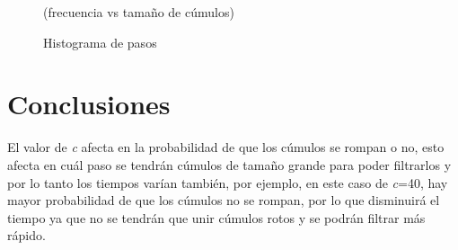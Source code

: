 \documentclass{article}
\begin{document}
\begin{figure}[h!]
\centering
{}
\caption{Histograma de pasos} (frecuencia vs tamaño de cúmulos) \label{fig7}
\end{figure}

\newpage
\section{Conclusiones}
El valor de \textit{c} afecta en la probabilidad de que los cúmulos se rompan o no, esto afecta en cuál paso se tendrán cúmulos de tamaño grande para poder filtrarlos y por lo tanto los tiempos varían también, por ejemplo, en este caso de \textit{c}=40, hay mayor probabilidad de que los cúmulos no se rompan, por lo que disminuirá el tiempo ya que no se tendrán que unir cúmulos rotos y se podrán filtrar más rápido.



\end{document}
